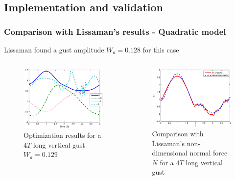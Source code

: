 \documentclass[compress]{beamer}
\begin{document}
\subsection{Implementation and validation}

\begin{frame}
  \frametitle{Comparison with Lissaman's results - Quadratic model}
  Lissaman found a gust amplitude $W_a=0.128$ for this case 
  \begin{columns}
    \begin{figure}[ht]
      \begin{center}	
	\includegraphics[width=1\textwidth]{./Figures/Windtype=1_Tg=4_Wg=0p129_quad_G=20.eps}
      \end{center}
      \caption{Optimization results for a $4T$ long vertical gust $W_a=0.129$}
    \end{figure}
    \begin{figure}[h]
      \centering
      \includegraphics[width=1\textwidth]{./Figures/LIssaman_N_comparison.eps}
      \caption{Comparison with Lissaman's non-dimensional normal force $N$ for a $4T$ long vertical gust}
    \end{figure}
  \end{columns}
\end{frame}
\end{document}
